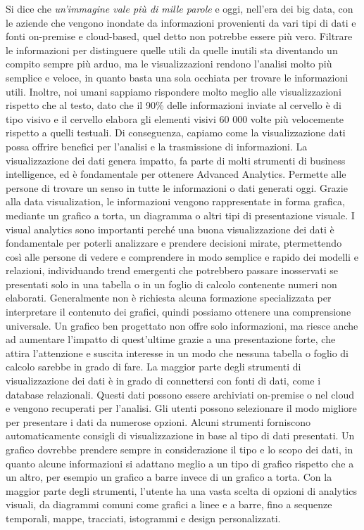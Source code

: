 Si dice che \textit{un'immagine vale più di mille parole} e oggi, nell'era dei big data, con le aziende che vengono inondate da informazioni provenienti da vari tipi di dati e fonti on-premise e cloud-based, quel detto non potrebbe essere più vero. Filtrare le informazioni per distinguere quelle utili da quelle inutili sta diventando un compito sempre più arduo, ma le visualizzazioni rendono l'analisi molto più semplice e veloce, in quanto basta una sola occhiata per trovare le informazioni utili. Inoltre, noi umani sappiamo rispondere molto meglio alle visualizzazioni rispetto che al testo, dato che il 90\% delle informazioni inviate al cervello è di tipo visivo e il cervello elabora gli elementi visivi 60 000 volte più velocemente rispetto a quelli testuali. Di conseguenza, capiamo come la visualizzazione dati possa offrire benefici per l'analisi e la trasmissione di informazioni.
La visualizzazione dei dati genera impatto, fa parte di molti strumenti di business intelligence, ed è fondamentale per ottenere Advanced Analytics. Permette alle persone di trovare un senso in tutte le informazioni o dati generati oggi. Grazie alla data visualization, le informazioni vengono rappresentate in forma grafica, mediante un grafico a torta, un diagramma o altri tipi di presentazione visuale.
I visual analytics sono importanti perché una buona visualizzazione dei dati è fondamentale per poterli analizzare e prendere decisioni mirate, ptermettendo così alle persone di vedere e comprendere in modo semplice e rapido dei modelli e relazioni, individuando trend emergenti che potrebbero passare inosservati se presentati solo in una tabella o in un foglio di calcolo contenente numeri non elaborati. Generalmente non è richiesta alcuna formazione specializzata per interpretare il contenuto dei grafici, quindi possiamo ottenere una comprensione universale. Un grafico ben progettato non offre solo informazioni, ma riesce anche ad aumentare l'impatto di quest'ultime grazie a una presentazione forte, che attira l'attenzione e suscita interesse in un modo che nessuna tabella o foglio di calcolo sarebbe in grado di fare.
La maggior parte degli strumenti di visualizzazione dei dati è in grado di connettersi con fonti di dati, come i database relazionali. Questi dati possono essere archiviati on-premise o nel cloud e vengono recuperati per l'analisi. Gli utenti possono selezionare il modo migliore per presentare i dati da numerose opzioni. Alcuni strumenti forniscono automaticamente consigli di visualizzazione in base al tipo di dati presentati.
Un grafico dovrebbe prendere sempre in considerazione il tipo e lo scopo dei dati, in quanto alcune informazioni si adattano meglio a un tipo di grafico rispetto che a un altro, per esempio un grafico a barre invece di un grafico a torta. Con la maggior parte degli strumenti, l'utente ha una vasta scelta di opzioni di analytics visuali, da diagrammi comuni come grafici a linee e a barre, fino a sequenze temporali, mappe, tracciati, istogrammi e design personalizzati.
